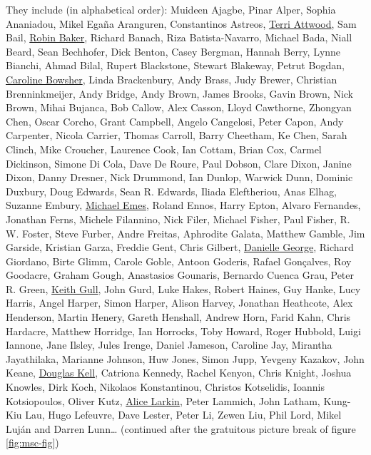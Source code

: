 \documentclass[
]{book}
\begin{document}
They include (in alphabetical order): Muideen Ajagbe, Pinar Alper, Sophia Ananiadou, Mikel Egaña Aranguren, Constantinos Astreos, \href{https://en.wikipedia.org/wiki/Terri_Attwood}{Terri Attwood}, Sam Bail, \href{https://en.wikipedia.org/wiki/Robin_Baker_(biologist)}{Robin Baker}, Richard Banach, Riza Batista-Navarro, Michael Bada, Niall Beard, Sean Bechhofer, Dick Benton, Casey Bergman, Hannah Berry, Lynne Bianchi, Ahmad Bilal, Rupert Blackstone, Stewart Blakeway, Petrut Bogdan, \href{https://www.advance-he.ac.uk/ntfs/professor-caroline-bowsher}{Caroline Bowsher}, Linda Brackenbury, Andy Brass, Judy Brewer, Christian Brenninkmeijer, Andy Bridge, Andy Brown, James Brooks, Gavin Brown, Nick Brown, Mihai Bujanca, Bob Callow, Alex Casson, Lloyd Cawthorne, Zhongyan Chen, Oscar Corcho, Grant Campbell, Angelo Cangelosi, Peter Capon, Andy Carpenter, Nicola Carrier, Thomas Carroll, Barry Cheetham, Ke Chen, Sarah Clinch, Mike Croucher, Laurence Cook, Ian Cottam, Brian Cox, Carmel Dickinson, Simone Di Cola, Dave De Roure, Paul Dobson, Clare Dixon, Janine Dixon, Danny Dresner, Nick Drummond, Ian Dunlop, Warwick Dunn, Dominic Duxbury, Doug Edwards, Sean R. Edwards, Iliada Eleftheriou, Anas Elhag, Suzanne Embury, \href{https://www.uoguelph.ca/mcb/people/dr-michael-j-emes}{Michael Emes}, Roland Ennos, Harry Epton, Alvaro Fernandes, Jonathan Ferns, Michele Filannino, Nick Filer, Michael Fisher, Paul Fisher, R. W. Foster, Steve Furber, Andre Freitas, Aphrodite Galata, Matthew Gamble, Jim Garside, Kristian Garza, Freddie Gent, Chris Gilbert, \href{https://en.wikipedia.org/wiki/Danielle_George}{Danielle George}, Richard Giordano, Birte Glimm, Carole Goble, Antoon Goderis, Rafael Gonçalves, Roy Goodacre, Graham Gough, Anastasios Gounaris, Bernardo Cuenca Grau, Peter R. Green, \href{https://en.wikipedia.org/wiki/Keith_Gull}{Keith Gull}, John Gurd, Luke Hakes, Robert Haines, Guy Hanke, Lucy Harris, Angel Harper, Simon Harper, Alison Harvey, Jonathan Heathcote, Alex Henderson, Martin Henery, Gareth Henshall, Andrew Horn, Farid Kahn, Chris Hardacre, Matthew Horridge, Ian Horrocks, Toby Howard, Roger Hubbold, Luigi Iannone, Jane Ilsley, Jules Irenge, Daniel Jameson, Caroline Jay, Mirantha Jayathilaka, Marianne Johnson, Huw Jones, Simon Jupp, Yevgeny Kazakov, John Keane, \href{https://en.wikipedia.org/wiki/Douglas_Kell}{Douglas Kell}, Catriona Kennedy, Rachel Kenyon, Chris Knight, Joshua Knowles, Dirk Koch, Nikolaos Konstantinou, Christos Kotselidis, Ioannis Kotsiopoulos, Oliver Kutz, \href{https://en.wikipedia.org/wiki/Alice_Larkin}{Alice Larkin}, Peter Lammich, John Latham, Kung-Kiu Lau, Hugo Lefeuvre, Dave Lester, Peter Li, Zewen Liu, Phil Lord, Mikel Luján and Darren Lunn\ldots{} (continued after the gratuitous picture break of figure \ref{fig:msc-fig})
\end{document}

